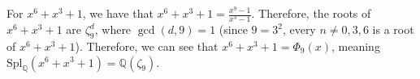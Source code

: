 \documentclass[11pt]{extarticle}
\newcommand{\Q}{\mathbb{Q}}
\begin{document}
  For $x^6 + x^3 + 1$, we have that $x^6 + x^3 + 1 = \frac{x^9-1}{x^3 - 1}$. Therefore, the roots of $x^6 + x^3 + 1$ are $\zeta_9^{d}$, where $\gcd(d,9) = 1$ (since $9 = 3^2$, every $n\neq 0,3,6$ is a root of $x^6 + x^3 + 1$). Therefore, we can see that $x^6 + x^3 + 1 = \Phi_{9}(x)$, meaning $\text{Spl}_{\Q}(x^6 + x^3 + 1) = \Q(\zeta_9)$.



\end{document}
